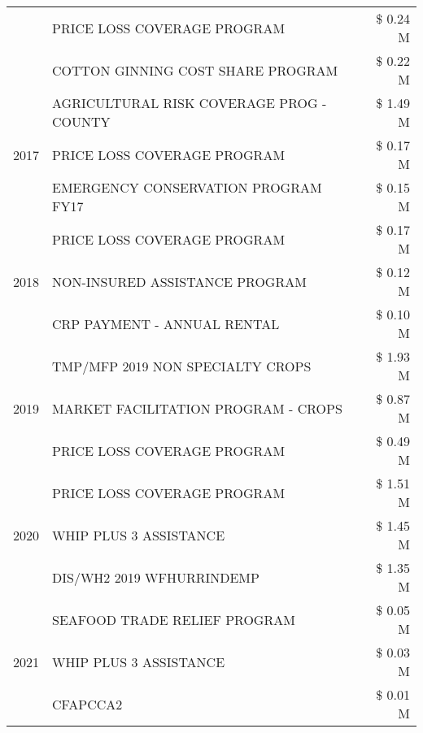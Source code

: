 \begin{tabular}{llr}
 & PRICE LOSS COVERAGE PROGRAM & \$ 0.24 M \\
 & COTTON GINNING COST SHARE PROGRAM & \$ 0.22 M \\
\cline{1-3}
\multirow[t]{3}{*}{2017} & AGRICULTURAL RISK COVERAGE PROG - COUNTY & \$ 1.49 M \\
 & PRICE LOSS COVERAGE PROGRAM & \$ 0.17 M \\
 & EMERGENCY CONSERVATION PROGRAM FY17 & \$ 0.15 M \\
\cline{1-3}
\multirow[t]{3}{*}{2018} & PRICE LOSS COVERAGE PROGRAM & \$ 0.17 M \\
 & NON-INSURED ASSISTANCE PROGRAM & \$ 0.12 M \\
 & CRP PAYMENT - ANNUAL RENTAL & \$ 0.10 M \\
\cline{1-3}
\multirow[t]{3}{*}{2019} & TMP/MFP 2019 NON SPECIALTY CROPS & \$ 1.93 M \\
 & MARKET FACILITATION PROGRAM - CROPS & \$ 0.87 M \\
 & PRICE LOSS COVERAGE PROGRAM & \$ 0.49 M \\
\cline{1-3}
\multirow[t]{3}{*}{2020} & PRICE LOSS COVERAGE PROGRAM & \$ 1.51 M \\
 & WHIP PLUS 3 ASSISTANCE & \$ 1.45 M \\
 & DIS/WH2 2019 WFHURRINDEMP & \$ 1.35 M \\
\cline{1-3}
\multirow[t]{3}{*}{2021} & SEAFOOD TRADE RELIEF PROGRAM & \$ 0.05 M \\
 & WHIP PLUS 3 ASSISTANCE & \$ 0.03 M \\
 & CFAPCCA2 & \$ 0.01 M \\
\cline{1-3}
\bottomrule
\end{tabular}
